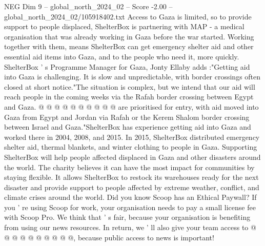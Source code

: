 \begin{textsample}{NEG Dim 9 – global\_north\_2024\_02 – Score -2.00 – global\_north\_2024\_02/105918402.txt}
Access to Gaza is limited, so to provide support to people displaced, ShelterBox is partnering with MAP - a medical organisation that was already working in Gaza before the war started.
Working together with them, means ShelterBox can get emergency shelter aid and other essential aid items into Gaza, and to the people who need it, more quickly.
ShelterBox ' s Programme Manager for Gaza, Jonty Ellaby adds :"Getting aid into Gaza is challenging.
It is slow and unpredictable, with border crossings often closed at short notice."The situation is complex, but we intend that our aid will reach people in the coming weeks via the Rafah border crossing between Egypt and Gaza. @ @ @ @ @ @ @ @ @ @ are prioritised for entry, with aid moved into Gaza from Egypt and Jordan via Rafah or the Kerem Shalom border crossing between Israel and Gaza."ShelterBox has experience getting aid into Gaza and worked there in 2004, 2008, and 2015.
In 2015, ShelterBox distributed emergency shelter aid, thermal blankets, and winter clothing to people in Gaza.
Supporting ShelterBox will help people affected displaced in Gaza and other disasters around the world.
The charity believes it can have the most impact for communities by staying flexible.
It allows ShelterBox to restock its warehouses ready for the next disaster and provide support to people affected by extreme weather, conflict, and climate crises around the world.
Did you know Scoop has an Ethical Paywall?
If you ' re using Scoop for work, your organisation needs to pay a small license fee with Scoop Pro.
We think that ' s fair, because your organisation is benefiting from using our news resources.
In return, we ' ll also give your team access to @ @ @ @ @ @ @ @ @ @, because public access to news is important!

\end{textsample}
